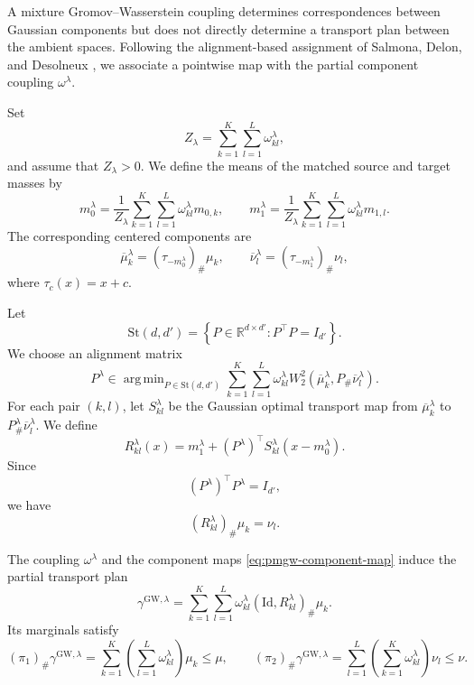 \documentclass[a4paper,11pt]{article}
\numberwithin{equation}{section}
\DeclareMathOperator*{\argmin}{arg\,min}
\newcommand{\RR}{\mathbb{R}}
\newcommand{\Id}{\mathrm{Id}}
\newcommand{\GW}{\mathrm{GW}}
\newcommand{\St}{\mathrm{St}}
\begin{document}
A mixture Gromov--Wasserstein coupling determines correspondences between Gaussian components but does not directly determine a transport plan between the ambient spaces. Following the alignment-based assignment of Salmona, Delon, and Desolneux \cite{delon-2023}, we associate a pointwise map with the partial component coupling $\omega^\lambda$.

Set
\begin{equation*}
  Z_\lambda=\sum_{k=1}^{K}\sum_{l=1}^{L}\omega^\lambda_{kl},
\end{equation*}
and assume that $Z_\lambda>0$. We define the means of the matched source and target masses by
\begin{equation}\label{eq:pmgw-matched-means}
  m_0^\lambda=\frac{1}{Z_\lambda}\sum_{k=1}^{K}\sum_{l=1}^{L}\omega^\lambda_{kl}m_{0,k},\qquad m_1^\lambda=\frac{1}{Z_\lambda}\sum_{k=1}^{K}\sum_{l=1}^{L}\omega^\lambda_{kl}m_{1,l}.
\end{equation}
The corresponding centered components are
\begin{equation*}
  \overline\mu_k^\lambda=(\tau_{-m_0^\lambda})_\#\mu_k,\qquad \overline\nu_l^\lambda=(\tau_{-m_1^\lambda})_\#\nu_l,
\end{equation*}
where $\tau_c(x)=x+c$.

Let
\begin{equation*}
  \St(d,d') = \left\{ P\in\RR^{d\times d'}: P^\top P=I_{d'} \right\}.
\end{equation*}
We choose an alignment matrix
\begin{equation}\label{eq:alignment-problem}
  P^\lambda \in \argmin_{P\in\St(d,d')} \sum_{k=1}^{K}\sum_{l=1}^{L} \omega^\lambda_{kl} W_2^2\left(\overline\mu_k^\lambda, P_\#\overline\nu_l^\lambda\right).
\end{equation}
For each pair $(k,l)$, let $S_{kl}^\lambda$ be the Gaussian optimal transport map from $\overline\mu_k^\lambda$ to $P^\lambda_\#\overline\nu_l^\lambda$. We define
\begin{equation}\label{eq:pmgw-component-map}
  R_{kl}^\lambda(x) = m_1^\lambda + (P^\lambda)^\top S_{kl}^\lambda\left(x-m_0^\lambda\right).
\end{equation}
Since
\begin{equation*}
  (P^\lambda)^\top P^\lambda=I_{d'},
\end{equation*}
we have
\begin{equation*}
  (R_{kl}^\lambda)_\#\mu_k=\nu_l.
\end{equation*}

The coupling $\omega^\lambda$ and the component maps \eqref{eq:pmgw-component-map} induce the partial transport plan
\begin{equation*}
\gamma^{\GW,\lambda}=\sum_{k=1}^{K}\sum_{l=1}^{L}\omega^\lambda_{kl}(\Id,R_{kl}^\lambda)_\#\mu_k.
\end{equation*}
Its marginals satisfy
\begin{equation*}
(\pi_1)_\#\gamma^{\GW,\lambda}=\sum_{k=1}^{K}\left(\sum_{l=1}^{L}\omega^\lambda_{kl}\right)\mu_k\leq\mu,\qquad (\pi_2)_\#\gamma^{\GW,\lambda}=\sum_{l=1}^{L}\left(\sum_{k=1}^{K}\omega^\lambda_{kl}\right)\nu_l\leq\nu.
\end{equation*}
\end{document}
